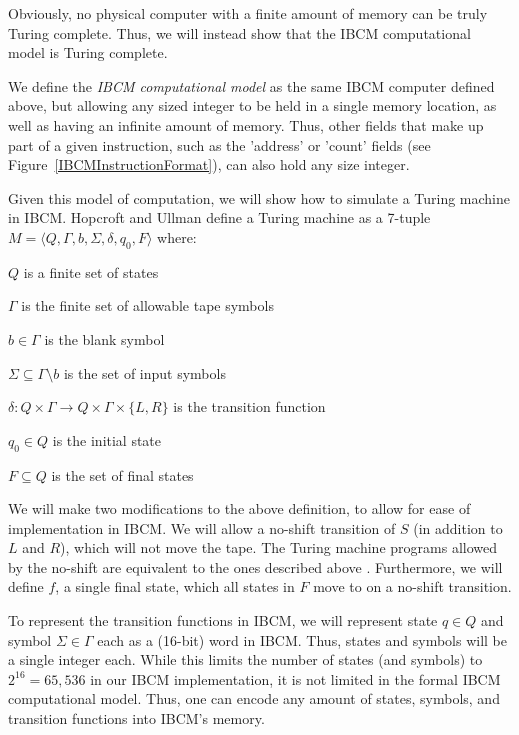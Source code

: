 Obviously, no physical computer with a finite amount of memory can be
truly Turing complete.  Thus, we will instead show that the IBCM
computational model is Turing complete.

We define the {\em IBCM computational model} as the same IBCM computer
defined above, but allowing any sized integer to be held in a single
memory location, as well as having an infinite amount of memory.
Thus, other fields that make up part of a given instruction, such as
the 'address' or 'count' fields (see
Figure~\ref{IBCMInstructionFormat}), can also hold any size integer.

Given this model of computation, we will show how to simulate a Turing
machine in IBCM.  Hopcroft and Ullman \cite{HopcroftAndUllman} define
a Turing machine as a 7-tuple $M=\langle
Q,\Gamma,b,\Sigma,\delta,q_0,F \rangle$ where:

\begin{itemlist}
\item $Q$ is a finite set of states
\item $\Gamma$ is the finite set of allowable tape symbols
\item $b \in \Gamma$ is the blank symbol
\item $\Sigma \subseteq \Gamma \setminus {b}$ is the set of input symbols
\item $\delta : Q \times \Gamma \rightarrow Q \times \Gamma \times \{L,R\}$ is the transition function
\item $q_0 \in Q$ is the initial state
\item $F \subseteq Q$ is the set of final states
\end{itemlist}

We will make two modifications to the above definition, to allow for
ease of implementation in IBCM.  We will allow a no-shift transition
of $S$ (in addition to $L$ and $R$), which will not move the tape.
The Turing machine programs allowed by the no-shift are equivalent to
the ones described above \cite{wikipedia:turingmachine}. Furthermore,
we will define $f$, a single final state, which all states in $F$ move
to on a no-shift transition.

To represent the transition functions in IBCM, we will represent state
$q \in Q$ and symbol $\Sigma \in \Gamma$ each as a (16-bit) word in
IBCM.  Thus, states and symbols will be a single integer each.  While
this limits the number of states (and symbols) to $2^{16}=65,536$ in
our IBCM implementation, it is not limited in the formal IBCM
computational model.  Thus, one can encode any amount of states,
symbols, and transition functions into IBCM's memory.

